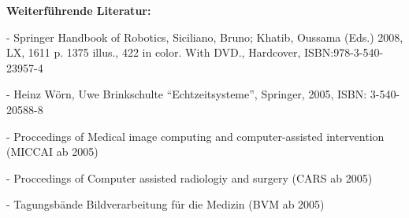 \begin{course}
\begin{media}
\end{media}

\begin{literature}\textbf{Weiterführende Literatur:}

 

- Springer Handbook of Robotics, Siciliano, Bruno; Khatib, Oussama (Eds.) 2008, LX, 1611 p. 1375 illus., 422 in color. With DVD., Hardcover, ISBN:978-3-540-23957-4

 

- Heinz Wörn, Uwe Brinkschulte “Echtzeitsysteme”, Springer, 2005, ISBN: 3-540-20588-8

 

- Proccedings of Medical image computing and computer-assisted intervention (MICCAI ab 2005)

 

- Proccedings of Computer assisted radiologiy and surgery (CARS ab 2005)

 

- Tagungsbände Bildverarbeitung für die Medizin (BVM ab 2005)

\end{literature}



\end{course}